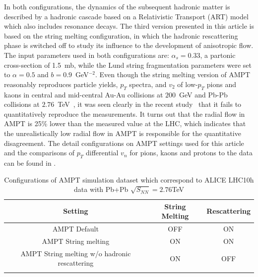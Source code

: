 In both configurations, the dynamics of the subsequent hadronic matter is described by a hadronic cascade based on a Relativistic Transport (ART) model~\cite{Li:2001xh} which also includes resonance decays.
The third version presented in this article is based on the string melting configuration, in which the hadronic rescattering phase is switched off to study its influence to the development of anisotropic flow.
The input parameters used in both configurations are: $\alpha_s = 0.33$, a partonic cross-section of 1.5~mb, while the Lund string fragmentation parameters were set to $\alpha = 0.5$ and $b = 0.9$~GeV$^{-2}$. 
Even though the string melting version of AMPT~\cite{Lin:2001zk,Lin:2004en} reasonably reproduces particle yields, $p_T$ spectra, and $v_2$ of low-$p_T$ pions and kaons in central and mid-central Au-Au collisions at $200$~GeV and Pb-Pb collisions at $2.76$~TeV~\cite{Lin:2014tya}, it was seen clearly in the recent study~\cite{Adam:2016nfo} that it fails to quantitatively reproduce the measurements. It turns out that the radial flow in AMPT is 25\% lower than the measured value at the LHC, which indicates that the unrealistically low radial flow in AMPT is responsible for the quantitative disagreement. The detail configurations on AMPT settings used for this article and the comparisons of $p_T$ differential $v_{n}$ for pions, kaons and protons to the data can be found in \cite{Adam:2016nfo}.






\begin{table}[!h]
\begin{center}
\begin{tabular}{c|c|c}
\hline 
Setting		    & String Melting    & Rescattering  \\  \hline  \hline
AMPT Default  & OFF     & ON        \\ \hline
AMPT String melting  & ON      &  ON        \\ \hline 
AMPT String melting w/o hadronic rescattering  & ON      & OFF         \\ \hline
\label{Tab:AMPTConf}
\end{tabular}
\caption{Configurations of AMPT simulation dataset which correspond to ALICE LHC10h data with Pb+Pb $\sqrt{S_{NN}}=2.76$TeV}
\end{center}
\end{table}


